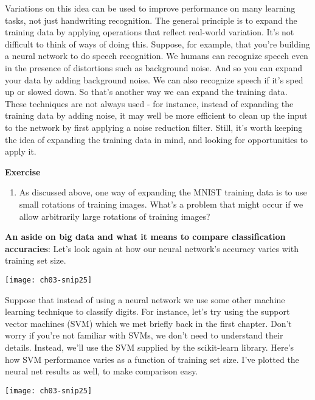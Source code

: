 Variations on this idea can be used to improve performance on many learning tasks, not just handwriting recognition. The general principle is to expand the training data by applying operations that reflect real-world variation. It's not difficult to think of ways of doing this. Suppose, for example, that you're building a neural network to do speech recognition. We humans can recognize speech even in the presence of distortions such as background noise. And so you can expand your data by adding background noise. We can also recognize speech if it's sped up or slowed down. So that's another way we can expand the training data. These techniques are not always used - for instance, instead of expanding the training data by adding noise, it may well be more efficient to clean up the input to the network by first applying a noise reduction filter. Still, it's worth keeping the idea of expanding the training data in mind, and looking for opportunities to apply it.

\textbf{Exercise}

\begin{enumerate}
\item As discussed above, one way of expanding the MNIST training data is to use small rotations of training images. What's a problem that might occur if we allow arbitrarily large rotations of training images? 
\end{enumerate}



\textbf{An aside on big data and what it means to compare classification accuracies}: Let's look again at how our neural network's accuracy varies with training set size.

\begin{marginfigure}
\texttt{[image: ch03-snip25]}
\end{marginfigure}

Suppose that instead of using a neural network we use some other machine learning technique to classify digits. For instance, let's try using the support vector machines (SVM) which we met briefly back in the first chapter. Don't worry if you're not familiar with SVMs, we don't need to understand their details. Instead, we'll use the SVM supplied by the scikit-learn library. Here's how SVM performance varies as a function of training set size. I've plotted the neural net results as well, to make comparison easy.

\begin{marginfigure}
\texttt{[image: ch03-snip25]}
\end{marginfigure}

